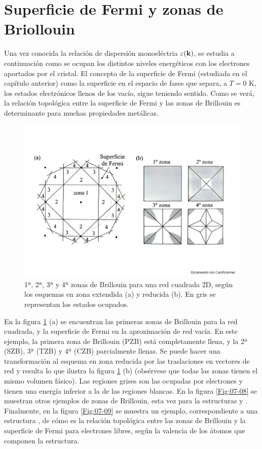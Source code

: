 \section{Superficie de Fermi y zonas de Briollouin}

Una vez conocida la relación de dispersión monoeléctria $\varepsilon(\mathbf{k})$, se estudia a continuación como se ocupan los distintos niveles energéticos con los electrones aportados por el cristal. El concepto de la superficie de Fermi (estudiada en el capítulo anterior) como la superficie en el espacio de fases que separa, a $T=0$ K, los estados electrónicos llenos de los vacío, sigue teniendo sentido. Como se verá, la relación topológica entre la superficie de Fermi y las zonas de Brillouin es determinante para muchas propiedades metálicas.

\begin{figure}[h!] \centering
	\includegraphics[scale=0.35]{Cuerpo/Ch_07/Fotos libro 7.pdf}
	\caption{1ª, 2ª, 3ª y 4ª zonas de Brillouin para una red cuadrada 2D, según los esquemas en zona extendida (a) y reducida (b). En gris se representan los estados ocupados.}
	\label{Fig:07-07}
\end{figure}    

En la figura \ref{Fig:07-07} (a) se encuentran las primeras zonas de Brillouin para la red cuadrada, y la superficie de Fermi en la aproximación de red vacía. En este ejemplo, la primera zona de Brillouin (PZB) está completamente llena, y la 2ª (SZB), 3ª (TZB) y 4ª (CZB) parcialmente llenas. Se puede hacer una transformación al esquema en zona reducida por las traslaciones en vectores de red y resulta lo que ilustra la figura \ref{Fig:07-07} (b) (obsérvese que todas las zonas tienen el mismo volumen fásico). Las regiones grises son las ocupadas por electrones y tienen una energía inferior a la de las regiones blancas. En la figura \ref{Fig:07-08} se muestran otros ejemplos de zonas de Brillouin, esta vez para la estructuras \bcc y \fcc. Finalmente, en la figura \ref{Fig:07-09} se muestra un ejemplo, correspondiente a una estructura \fcc, de cómo es la relación topológica entre las zonas de Brillouin y la superficie de Fermi para electrones libres, según la valencia de los átomos que componen la estructura. 

